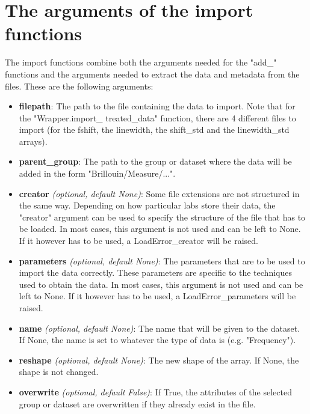 \section{The arguments of the import functions}
    The import functions combine both the arguments needed for the "add\_" functions and the arguments needed to extract the data and metadata from the files. These are the following arguments:
    \begin{itemize}
        \item \textbf{filepath}: The path to the file containing the data to import. Note that for the "Wrapper.import\_ treated\_data" function, there are 4 different files to import (for the fshift, the linewidth, the shift\_std and the linewidth\_std arrays).
        \item \textbf{parent\_group}: The path to the group or dataset where the data will be added in the form "Brillouin/Measure/...".
        \item \textbf{creator} \textit{(optional, default None)}: Some file extensions are not structured in the same way. Depending on how particular labs store their data, the "creator" argument can be used to specify the structure of the file that has to be loaded. In most cases, this argument is not used and can be left to None. If it however has to be used, a LoadError\_creator will be raised.
        \item \textbf{parameters} \textit{(optional, default None)}: The parameters that are to be used to import the data correctly. These parameters are specific to the techniques used to obtain the data. In most cases, this argument is not used and can be left to None. If it however has to be used, a LoadError\_parameters will be raised.
        \item \textbf{name} \textit{(optional, default None)}: The name that will be given to the dataset. If None, the name is set to whatever the type of data is (e.g. "Frequency").
        \item \textbf{reshape} \textit{(optional, default None)}: The new shape of the array. If None, the shape is not changed.    
        \item \textbf{overwrite} \textit{(optional, default False)}: If True, the attributes of the selected group or dataset are overwritten if they already exist in the file.
    \end{itemize}
